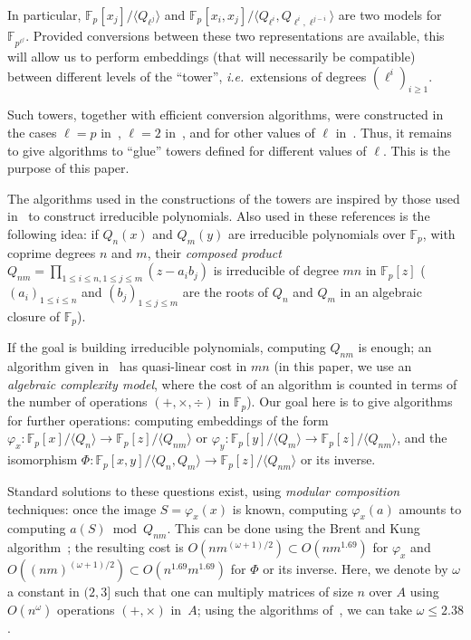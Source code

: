 \documentclass{sig-alternate}
\def\F {\ensuremath{\mathbb{F}}}
\newcounter{algo}
\newcommand{\ang}[1]{\langle#1\rangle}
\begin{document}
In particular, $\F_p[x_j]/\ang{Q_{\ell^j}}$ and
$\F_p[x_i,x_j]/\ang{Q_{\ell^i},Q_{\ell^i,\ell^{j-i}}}$ are two models
for $\F_{p^{\ell^j}}$. Provided conversions between these two
representations are available, this will allow us to perform
embeddings (that will necessarily be compatible) between different
levels of the ``tower'', \emph{i.e.}\ extensions of degrees $(\ell^i)_{i
  \ge 1}$.

Such towers, together with efficient conversion algorithms, were
constructed in the cases $\ell = p$
in~\cite{cantor89,couveignes00,df+schost12}, $\ell=2$
in~\cite{DoSc12}, and for other values of $\ell$ in~\cite{DeDoSc13}.
Thus, it remains to give algorithms to ``glue'' towers defined for
different values of $\ell$. This is the purpose of this paper.

\smallskip{} The algorithms used
in the constructions of the towers are inspired by those used
in~\cite{Shoup90,shoup94,couveignes+lercier11} to construct
irreducible polynomials. Also used in these references is the
following idea: if $Q_n(x)$ and $Q_m(y)$ are irreducible polynomials
over $\F_p$, with coprime degrees $n$ and $m$, their {\em composed
  product} $Q_{nm} = \prod_{1 \le i \le n, 1 \le j \le m} (z- a_i
b_j)$ is irreducible of degree $mn$ in $\F_p[z]$ ($(a_i)_{1 \le
  i \le n}$ and $(b_j)_{1 \le j \le m}$ are the roots of $Q_n$ and
$Q_m$ in an algebraic closure of $\F_p$).

If the goal is building irreducible polynomials, computing $Q_{nm}$ is
enough; an algorithm given in~\cite{BoFlSaSc06} has quasi-linear cost
in $mn$ (in this paper, we use an {\em algebraic complexity model},
where the cost of an algorithm is counted in terms of the number of
operations $(+,\times,\div)$ in $\F_p$). Our goal here is to give
algorithms for further operations: computing embeddings of the form
$\varphi_x: \F_p[x]/\ang{Q_n}\to \F_p[z]/\ang{Q_{nm}}$ or $\varphi_y:
\F_p[y]/\ang{Q_m}\to \F_p[z]/\ang{Q_{nm}}$, and the isomorphism $\Phi:
\F_p[x,y]/\ang{Q_n,Q_m}\to \F_p[z]/\ang{Q_{nm}}$ or its inverse.

Standard solutions to these questions exist, using {\em modular
  composition} techniques: once the image $S=\varphi_x(x)$ is known,
computing $\varphi_x(a)$ amounts to computing $a(S) \bmod Q_{nm}$.
This can be done using the Brent and Kung algorithm~\cite{brent+kung};
the resulting cost is $O(n m^{(\omega+1)/2}) \subset O(n m^{1.69})$
for $\varphi_x$ and $O((n m)^{(\omega+1)/2}) \subset O(n^{1.69}
m^{1.69})$ for $\Phi$ or its inverse. Here, we denote by $\omega$ a
constant in $(2,3]$ such that one can multiply matrices of size $n$
  over $A$ using $O(n^\omega)$ operations $(+,\times)$ in~$A$; using
  the algorithms of~\cite{coppersmith+winograd,Williams12}, we can
  take $\omega \le 2.38$.
\end{document}

